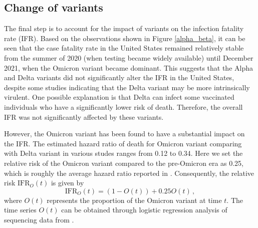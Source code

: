 \documentclass[sn-mathphys,Numbered]{sn-jnl}
\begin{document}
\subsection{Change of variants}
The final step is to account for the impact of variants on the infection fatality rate (IFR). Based on the observations shown in Figure \ref{alpha_beta}, it can be seen that the case fatality rate in the United States remained relatively stable from the summer of 2020 (when testing became widely available) until December 2021, when the Omicron variant became dominant. This suggests that the Alpha and Delta variants did not significantly alter the IFR in the United States, despite some studies indicating that the Delta variant may be more intrinsically virulent. One possible explanation is that Delta can infect some vaccinated individuals who have a significantly lower risk of death. Therefore, the overall IFR was not significantly affected by these variants.

However, the Omicron variant has been found to have a substantial impact on the IFR. The estimated hazard ratio of death for Omicron variant comparing with Delta variant in various studes ranges from 0.12 to 0.34. Here we set the relative risk of the Omicron variant compared to the pre-Omicron era as 0.25, which is roughly the average hazard ratio reported in \cite{omicron1,omicron2,omicron3,omicron4}. Consequently, the relative risk $\mathrm{IFR}_O(t)$ is given by
$$
\mathrm{IFR}_O(t) = (1 - O(t)) + 0.25 O(t) \,,
$$
where $O(t)$ represents the proportion of the Omicron variant at time $t$. The time series $O(t)$ can be obtained through logistic regression analysis of sequencing data from \cite{CDCvariant}.





\end{document}

